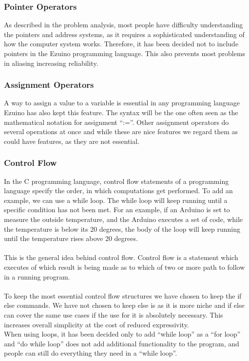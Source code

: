 \subsubsection*{Pointer Operators}
As described in the problem analysis, most people have difficulty understanding the pointers and address systems, as it requires a sophisticated understanding of how the computer system works. Therefore, it has been decided not to include pointers in the Ezuino programming language. This also prevents most problems in aliasing increasing reliability.
\subsubsection*{Assignment Operators}
A way to assign a value to a variable is essential in any programming language Ezuino has also kept this feature. The syntax will be the one often seen as the mathematical notation for assignment “:=”. Other assignment operators do several operations at once and while these are nice features we regard them as could have features, as they are not essential.
\subsubsection*{Control Flow}
In the C programming language, control flow statements of a programming language specify the order, in which computations get performed. To add an example, we can use a while loop. The while loop will keep running until a specific condition has not been met. For an example, if an Arduino is set to measure the outside temperature, and the Arduino executes a set of code, while the temperature is below its 20 degrees, the body of the loop will keep running until the temperature rises above 20 degrees. \\
\\
This is the general idea behind control flow. Control flow is a statement which executes of which result is being made as to which of two or more path to follow in a running program. \\
\\
To keep the most essential control flow structures we have chosen to keep the if else commands. We have not chosen to keep else is as it is more niche and if else can cover the same use cases if the use for it is absolutely necessary. This increases overall simplicity at the cost of reduced expressivity.
\\
When using loops, it has been decided only to add “while loop” as a “for loop” and “do while loop” does not add additional functionality to the program, and people can still do everything they need in a “while loop”.
